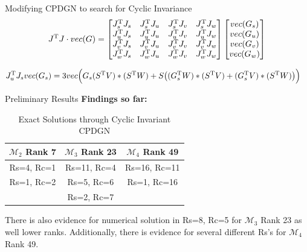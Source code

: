 \documentclass[final,hyperref={pdfpagelabels=false}]{beamer}
\begin{document}
\begin{frame}[t]
\begin{columns}[t]
\begin{column}{.5\linewidth}
\begin{block}{Modifying CPDGN to search for Cyclic Invariance}
            \begin{equation*}
                J^{\text T} J \cdot vec(G) = 
                \begin{bmatrix}
                    J_s^{\text T} J_s & J_s^{\text T} J_u & J_s^{\text T} J_v & J_s^{\text T} J_w \\
                    J_u^{\text T} J_s & J_u^{\text T} J_u & J_u^{\text T} J_v & J_u^{\text T} J_w \\
                    J_v^{\text T} J_s & J_v^{\text T} J_u & J_v^{\text T} J_v & J_v^{\text T} J_w \\
                    J_w^{\text T} J_s & J_w^{\text T} J_u & J_w^{\text T} J_v & J_w^{\text T} J_w
                \end{bmatrix}
                \begin{bmatrix}
                    vec(G_s) \\
                    vec(G_u) \\
                    vec(G_v) \\
                    vec(G_w)
                \end{bmatrix}
            \end{equation*}

            \begin{eqnarray*}
                J_u^{\text T} J_svec(G_s) & = 3 vec\Bigl(G_s(S^{\text T} V)\ast (S^{\text T} W) + S\bigl((G_s^{\text T} W)\ast (S^{\text T} V) + (G_s^{\text T} V)\ast (S^{\text T} W)\bigl)\Bigl)
            \end{eqnarray*}           
        \end{block}

        
        \begin{block}{Preliminary Results}
        \textbf{Findings so far:}
            \begin{table}
              \centering
              \begin{tabular}{|c|c|c|}
                \hline
                $\mathcal{M}_2$ Rank 7 & $\mathcal{M}_3$ Rank 23 & $\mathcal{M}_4$ Rank 49\\
                \hline
                Rs=4, Rc=1 & Rs=11, Rc=4 & Rs=16, Rc=11 \\
                \hline
                Rs=1, Rc=2 & Rs=5, Rc=6 & Rs=1, Rc=16 \\
                \hline
                & Rs=2, Rc=7 & \\
                \hline
              \end{tabular}
              \caption{Exact Solutions through Cyclic Invariant CPDGN}
              \label{tab:simple_table}
            \end{table}
            There is also evidence for numerical solution in Rs=8, Rc=5 for $\mathcal{M}_3$ Rank 23 as well lower ranks. Additionally, there is evidence for several different Rs's for $\mathcal{M}_4$ Rank 49. 


\end{block}
\end{column}
\end{columns}
\end{frame}
\end{document}
